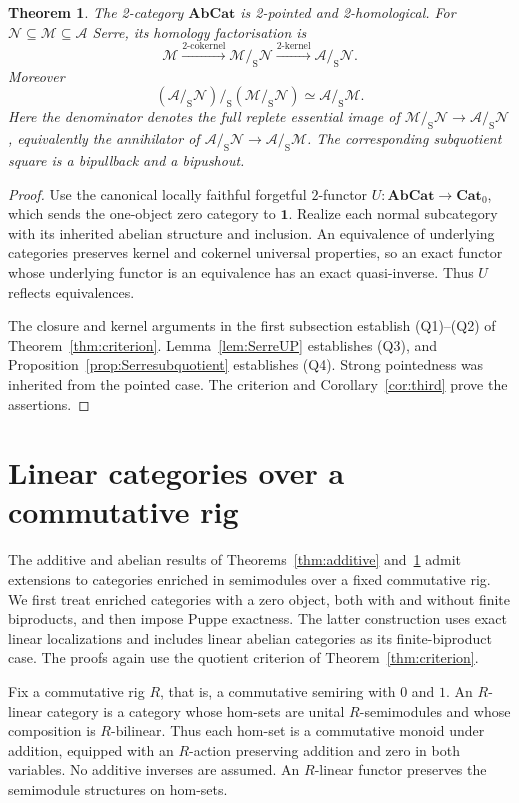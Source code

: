 \documentclass[11pt,reqno,a4paper]{amsart}
\newtheorem{theorem}{Theorem}[section]
\theoremstyle{definition}
\theoremstyle{remark}
\newcommand{\A}{\mathcal{A}}
\newcommand{\M}{\mathcal{M}}
\newcommand{\N}{\mathcal{N}}
\newcommand{\0}{\mathbf{0}}
\renewcommand{\1}{\mathbf{1}}
\newcommand{\AbCat}{\mathbf{AbCat}}
\newcommand{\Pt}{\mathbf{Cat}_{0}}
\newcommand{\sq}[2]{#1/_{\!\mathrm S}#2}
\begin{document}
\begin{theorem}\label{thm:abelian}
The 2-category $\AbCat$ is 2-pointed and 2-homological. For
$\N\subseteq\M\subseteq\A$ Serre, its homology factorisation is
\[
 \M\xrightarrow{\text{2-cokernel}}\sq{\M}{\N}
 \xrightarrow{\text{2-kernel}}\sq{\A}{\N}.
\]
Moreover
\[
 (\sq{\A}{\N})/_{\!\mathrm S}(\sq{\M}{\N})
 \simeq\sq{\A}{\M}.
\]
Here the denominator denotes the full replete essential image of
$\sq{\M}{\N}\to\sq{\A}{\N}$, equivalently the annihilator of
$\sq{\A}{\N}\to\sq{\A}{\M}$. The corresponding subquotient
square is a bipullback and a bipushout.
\end{theorem}
\begin{proof}
Use the canonical locally faithful forgetful $2$-functor
$U:\AbCat\to\Pt$, which sends the one-object zero category
to $\mathbf1$. Realize each normal subcategory with its
inherited abelian structure and inclusion. An equivalence
of underlying categories preserves kernel and cokernel
universal properties, so an exact functor whose underlying
functor is an equivalence has an exact quasi-inverse.
Thus $U$ reflects equivalences.

The closure and kernel arguments in the first subsection establish
(Q1)--(Q2) of Theorem~\ref{thm:criterion}. Lemma~\ref{lem:SerreUP}
establishes (Q3), and Proposition~\ref{prop:Serresubquotient} establishes
(Q4). Strong pointedness was inherited from the pointed case. The
criterion and Corollary~\ref{cor:third} prove the assertions.
\end{proof}





\section{Linear categories over a commutative rig}\label{sec:rig-linear}

The additive and abelian results of Theorems~\ref{thm:additive}
and~\ref{thm:abelian} admit extensions to categories enriched in
semimodules over a fixed commutative rig. We first treat enriched
categories with a zero object, both with and without finite
biproducts, and then impose Puppe exactness. The latter construction
uses exact linear localizations and includes linear abelian
categories as its finite-biproduct case. The proofs again use the
quotient criterion of Theorem~\ref{thm:criterion}.

Fix a commutative rig $R$, that is, a commutative semiring with
$0$ and $1$. An $R$-linear category is a category whose hom-sets
are unital $R$-semimodules and whose composition is $R$-bilinear.
Thus each hom-set is a commutative monoid under addition, equipped
with an $R$-action preserving addition and zero in both variables.
No additive inverses are assumed. An $R$-linear functor preserves
the semimodule structures on hom-sets.
\end{document}

